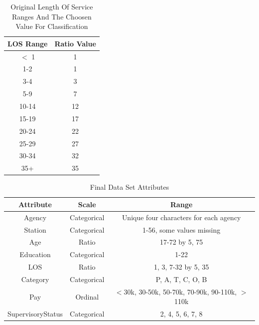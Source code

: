 \documentclass{article}
\begin{document}
    \begin{center}
        \begin{table}
            \centering
            \begin{tabular}{ |c|c| }
                \hline
                LOS Range & Ratio Value \\
                \hline
                $<$ 1 & 1 \\
                1-2 & 1 \\
                3-4 & 3 \\
                5-9 & 7 \\
                10-14 & 12 \\
                15-19 & 17 \\
                20-24 & 22 \\
                25-29 & 27 \\
                30-34 & 32 \\
                35+ & 35 \\
                \hline
            \end{tabular}
            \caption{Original Length Of Service Ranges And The Choosen Value For Classification}
            \label{tab:4}
        \end{table}
    \end{center}

    \begin{center}
        \begin{table}
            \centering
            \begin{tabular}{ |c|c|c| }
                \hline
                Attribute & Scale & Range \\
                \hline
                Agency & Categorical & Unique four characters for each agency \\
                Station & Categorical & 1-56, some values missing \\
                Age & Ratio & 17-72 by 5, 75 \\
                Education & Categorical & 1-22 \\
                LOS & Ratio & 1, 3, 7-32 by 5, 35 \\
                Category & Categorical & P, A, T, C, O, B \\
                Pay & Ordinal & $<$30k, 30-50k, 50-70k, 70-90k, 90-110k, $>$110k \\
                SupervisoryStatus & Categorical & 2, 4, 5, 6, 7, 8 \\
                \hline
            \end{tabular}
            \caption{Final Data Set Attributes}
            \label{tab:5}
        \end{table}
    \end{center}
\end{document}
